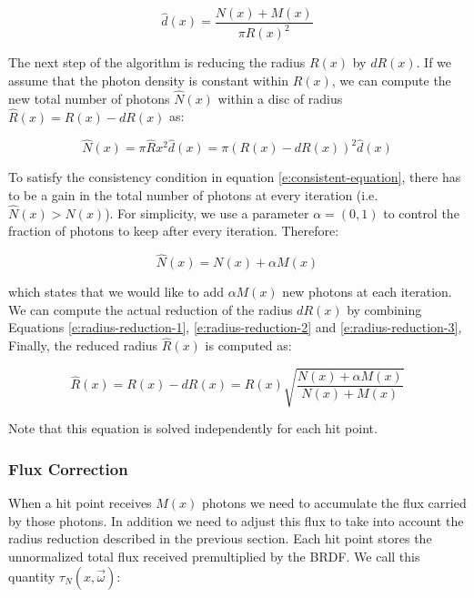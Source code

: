 \begin{equation}\label{e:radius-reduction-1}
	\hat{d}(x)=\frac{N(x)+M(x)}{\pi R(x)^{2}}
\end{equation}

The next step of the algorithm is reducing the radius $R(x)$ by $dR(x)$. If we assume that the photon density is constant within $R(x)$, we can compute the new total number of photons $\hat{N}(x)$ within a disc of radius $\hat{R}(x)=R(x)-dR(x)$ as:

\begin{equation}\label{e:radius-reduction-2}
	\hat{N}(x)=\pi\hat{R}{x}^{2}\hat{d}(x)=\pi (R(x)-dR(x))^{2}\hat{d}(x)
\end{equation}

To satisfy the consistency condition in equation \ref{e:consistent-equation}, there has to be a gain in the total number of photons at every iteration (i.e. $\hat{N}(x)>N(x)$). For simplicity, we use a parameter $\alpha = (0, 1)$ to control the fraction of photons to keep after every iteration. Therefore:

\begin{equation}\label{e:radius-reduction-3}
	\hat{N}(x)=N(x)+\alpha M(x)
\end{equation}

which states that we would like to add $\alpha M(x)$ new photons at each iteration. We can compute the actual reduction of the radius $dR(x)$ by combining Equations \ref{e:radius-reduction-1}, \ref{e:radius-reduction-2} and \ref{e:radius-reduction-3}, Finally, the reduced radius $\hat{R}(x)$ is computed as:

\begin{equation}
	\hat{R}(x)=R(x)-dR(x)=R(x)\sqrt{\frac{N(x)+\alpha M(x)}{N(x)+M(x)}}
\end{equation}

Note that this equation is solved independently for each hit point.



\subsubsection{Flux Correction}
When a hit point receives $M(x)$ photons we need to accumulate the flux carried by those photons. In addition we need to adjust this flux to take into account the radius reduction described in the previous section. Each hit point stores the unnormalized total flux received premultiplied by the BRDF. We call this quantity $\tau_N(x,\vec{\omega})$:

